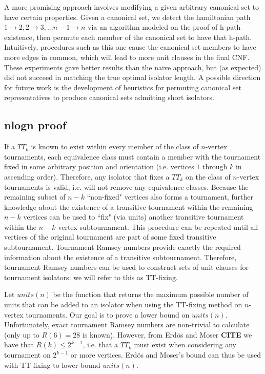 \documentclass[a4paper,UKenglish,cleveref, autoref, thm-restate]{lipics-v2021}
\begin{document}
A more promising approach involves modifying a given arbitrary canonical set to have certain properties. Given a canonical set, we detect the hamiltonian path $1\rightarrow 2,2\rightarrow 3,... n-1\rightarrow n$ via an algorithm modeled on the proof of h-path existence, then permute each member of the canonical set to have that h-path. Intuitively, procedures such as this one cause the canonical set members to have more edges in common, which will lead to more unit clauses in the final CNF. These experiments gave better results than the naive approach, but (as expected) did not succeed in matching the true optimal isolator length. A possible direction for future work is the development of heuristics for permuting canonical set representatives to produce canonical sets admitting short isolators.

\subsection{nlogn proof}
If a $TT_k$ is known to exist within every member of the class of $n$-vertex tournaments, each equivalence class must contain a member with the tournament fixed in some arbitrary position and orientation (i.e. vertices $1$ through $k$ in ascending order). Therefore, any isolator that fixes a $TT_k$ on the class of $n$-vertex tournaments is valid, i.e. will not remove any equivalence classes. Because the remaining subset of $n-k$ ``non-fixed" vertices also forms a tournament, further knowledge about the existence of a transitive tournament within the remaining $n-k$ vertices can be used to ``fix" (via units) another transitive tournament within the $n-k$ vertex subtournament. This procedure can be repeated until all vertices of the original tournament are part of some fixed transitive subtournament. Tournament Ramsey numbers provide exactly the required information about the existence of a transitive subtournament. Therefore, tournament Ramsey numbers can be used to construct sets of unit clauses for tournament isolators: we will refer to this as TT-fixing.

Let $units(n)$ be the function that returns the maximum possible number of units that can be added to an isolator when using the TT-fixing method on $n$-vertex tournaments. Our goal is to prove a lower bound on $units(n)$. Unfortunately, exact tournament Ramsey numbers are non-trivial to calculate (only up to $R(6) = 28$ is known). However, from Erd{\"o}s and Moser \textbf{CITE} we have that $R(k) \leq 2^{k-1}$, i.e. that a $TT_{k}$ must exist when considering any tournament on $2^{k-1}$ or more vertices. Erd{\"o}s and Moser's bound can thus be used with TT-fixing to lower-bound $units(n)$.
\end{document}
